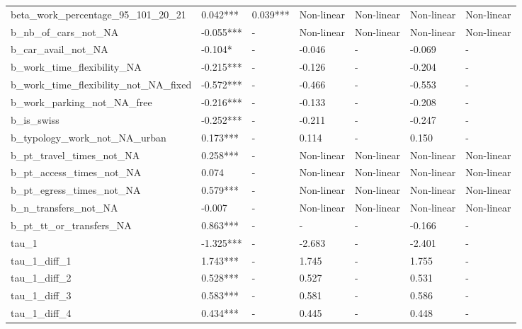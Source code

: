 \begin{tabular}{lllllll}
beta_work_percentage_95_101_20_21 & 0.042*** & 0.039*** & Non-linear & Non-linear & Non-linear & Non-linear \\
b_nb_of_cars_not_NA & -0.055*** & - & Non-linear & Non-linear & Non-linear & Non-linear \\
b_car_avail_not_NA & -0.104* & - & -0.046 & - & -0.069 & - \\
b_work_time_flexibility_NA & -0.215*** & - & -0.126 & - & -0.204 & - \\
b_work_time_flexibility_not_NA_fixed & -0.572*** & - & -0.466 & - & -0.553 & - \\
b_work_parking_not_NA_free & -0.216*** & - & -0.133 & - & -0.208 & - \\
b_is_swiss & -0.252*** & - & -0.211 & - & -0.247 & - \\
b_typology_work_not_NA_urban & 0.173*** & - & 0.114 & - & 0.150 & - \\
b_pt_travel_times_not_NA & 0.258*** & - & Non-linear & Non-linear & Non-linear & Non-linear \\
b_pt_access_times_not_NA & 0.074 & - & Non-linear & Non-linear & Non-linear & Non-linear \\
b_pt_egress_times_not_NA & 0.579*** & - & Non-linear & Non-linear & Non-linear & Non-linear \\
b_n_transfers_not_NA & -0.007 & - & Non-linear & Non-linear & Non-linear & Non-linear \\
b_pt_tt_or_transfers_NA & 0.863*** & - & - & - & -0.166 & - \\
tau_1 & -1.325*** & - & -2.683 & - & -2.401 & - \\
tau_1_diff_1 & 1.743*** & - & 1.745 & - & 1.755 & - \\
tau_1_diff_2 & 0.528*** & - & 0.527 & - & 0.531 & - \\
tau_1_diff_3 & 0.583*** & - & 0.581 & - & 0.586 & - \\
tau_1_diff_4 & 0.434*** & - & 0.445 & - & 0.448 & - \\
\bottomrule
\end{tabular}

